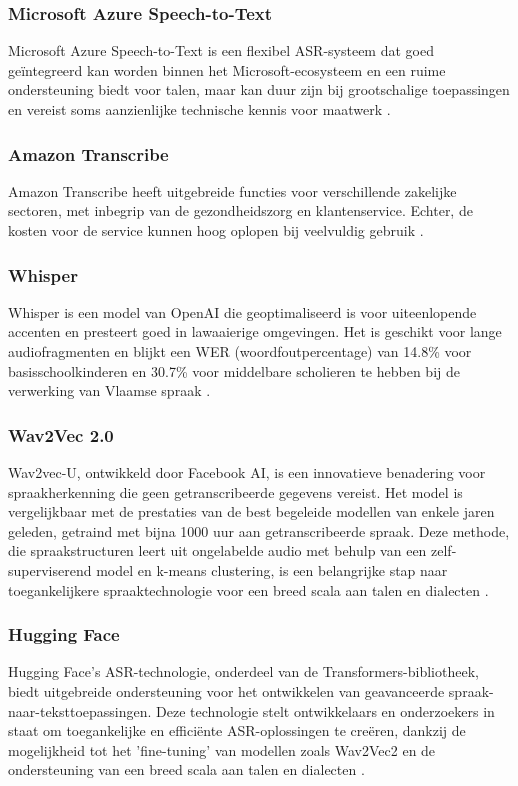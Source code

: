 \subsubsection{Microsoft Azure Speech-to-Text}
Microsoft Azure Speech-to-Text is een flexibel ASR-systeem dat goed geïntegreerd kan worden binnen het Microsoft-ecosysteem en een ruime ondersteuning biedt voor talen, maar kan duur zijn bij grootschalige toepassingen en vereist soms aanzienlijke technische kennis voor maatwerk \autocite{azurespeech2024}.

\subsubsection{Amazon Transcribe}
Amazon Transcribe heeft uitgebreide functies voor verschillende zakelijke sectoren, met inbegrip van de gezondheidszorg en klantenservice. Echter, de kosten voor de service kunnen hoog oplopen bij veelvuldig gebruik \textcite{AmazonTranscribe2023}.

\subsubsection{Whisper}
 Whisper is een model van OpenAI die geoptimaliseerd is voor uiteenlopende accenten en presteert goed in lawaaierige omgevingen. Het is geschikt voor lange audiofragmenten en blijkt een WER (woordfoutpercentage) van 14.8\% voor basisschoolkinderen en 30.7\% voor middelbare scholieren te hebben bij de verwerking van Vlaamse spraak \autocite{whisper2023}.

\subsubsection{Wav2Vec 2.0}
Wav2vec-U, ontwikkeld door Facebook AI, is een innovatieve benadering voor spraakherkenning die geen getranscribeerde gegevens vereist. Het model is vergelijkbaar met de prestaties van de best begeleide modellen van enkele jaren geleden, getraind met bijna 1000 uur aan getranscribeerde spraak. Deze methode, die spraakstructuren leert uit ongelabelde audio met behulp van een zelf-superviserend model en k-means clustering, is een belangrijke stap naar toegankelijkere spraaktechnologie voor een breed scala aan talen en dialecten \autocite{wav2vecu2021}.

\subsubsection{Hugging Face}
Hugging Face's ASR-technologie, onderdeel van de Transformers-bibliotheek, biedt uitgebreide ondersteuning voor het ontwikkelen van geavanceerde spraak-naar-teksttoepassingen. Deze technologie stelt ontwikkelaars en onderzoekers in staat om toegankelijke en efficiënte ASR-oplossingen te creëren, dankzij de mogelijkheid tot het 'fine-tuning' van modellen zoals Wav2Vec2 en de ondersteuning van een breed scala aan talen en dialecten \autocite{huggingface2023asr}.

